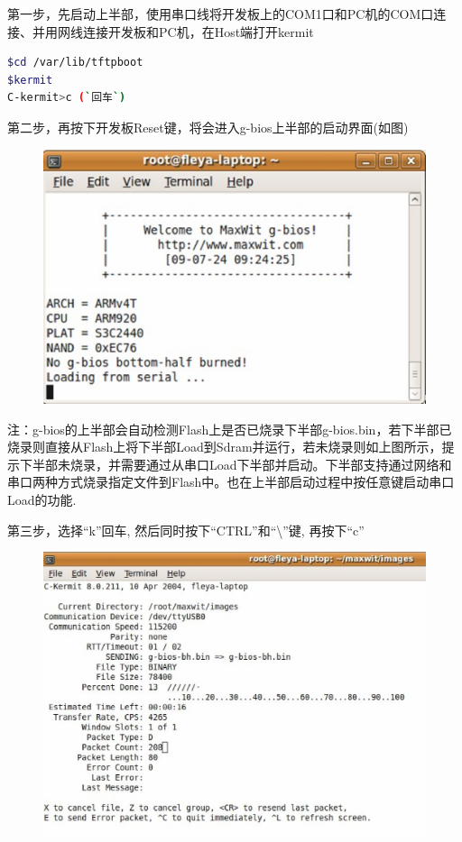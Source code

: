 \noindent{}第一步，先启动上半部，使用串口线将开发板上的COM1口和PC机的COM口连接、并用网线连接开发板和PC机，在Host端打开kermit\\
\begin{lstlisting}[language=bash,escapeinside=``]
$cd /var/lib/tftpboot
$kermit
C-kermit>c (`回车`)
\end{lstlisting}
\noindent{}第二步，再按下开发板Reset键，将会进入g-bios上半部的启动界面(如图)\\

\begin{figure}[t]
\centering
\includegraphics[width=5in]{image/step2.eps}
\end{figure}

\noindent{}注：g-bios的上半部会自动检测Flash上是否已烧录下半部g-bios.bin，若下半部已烧录则直接从Flash上将下半部Load到Sdram并运行，若未烧录则如上图所示，提示下半部未烧录，并需要通过从串口Load下半部并启动。下半部支持通过网络和串口两种方式烧录指定文件到Flash中。也在上半部启动过程中按任意键启动串口Load的功能.

\noindent{}第三步，选择``k''回车, 然后同时按下``CTRL''和``\textbackslash''键, 再按下``c''\\

\begin{figure}[H]
\centering
\includegraphics[width=5in]{image/step3.eps}
\end{figure}

